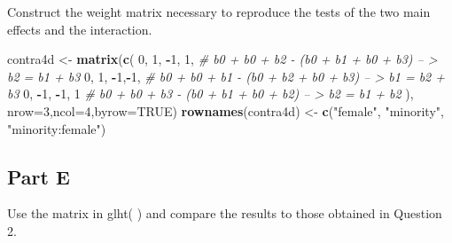 \documentclass[]{article}
\newenvironment{Shaded}{\begin{snugshade}}{\end{snugshade}}
\newcommand{\KeywordTok}[1]{\textcolor[rgb]{0.13,0.29,0.53}{\textbf{#1}}}
\newcommand{\DataTypeTok}[1]{\textcolor[rgb]{0.13,0.29,0.53}{#1}}
\newcommand{\DecValTok}[1]{\textcolor[rgb]{0.00,0.00,0.81}{#1}}
\newcommand{\StringTok}[1]{\textcolor[rgb]{0.31,0.60,0.02}{#1}}
\newcommand{\CommentTok}[1]{\textcolor[rgb]{0.56,0.35,0.01}{\textit{#1}}}
\newcommand{\OtherTok}[1]{\textcolor[rgb]{0.56,0.35,0.01}{#1}}
\newcommand{\OperatorTok}[1]{\textcolor[rgb]{0.81,0.36,0.00}{\textbf{#1}}}
\newcommand{\NormalTok}[1]{#1}
\begin{document}
Construct the weight matrix necessary to reproduce the tests of the two
main effects and the interaction.

\begin{Shaded}
\begin{Highlighting}[]
\NormalTok{contra4d <-}\StringTok{ }\KeywordTok{matrix}\NormalTok{(}\KeywordTok{c}\NormalTok{(}
    \DecValTok{0}\NormalTok{,  }\DecValTok{1}\NormalTok{, }\OperatorTok{-}\DecValTok{1}\NormalTok{, }\DecValTok{1}\NormalTok{, }\CommentTok{# b0 + b0 + b2 - (b0 + b1 + b0 + b3) -- > b2 = b1 + b3}
    \DecValTok{0}\NormalTok{,  }\DecValTok{1}\NormalTok{, }\OperatorTok{-}\DecValTok{1}\NormalTok{,}\OperatorTok{-}\DecValTok{1}\NormalTok{, }\CommentTok{# b0 + b0 + b1 - (b0 + b2 + b0 + b3) -- > b1 = b2 + b3}
    \DecValTok{0}\NormalTok{, }\OperatorTok{-}\DecValTok{1}\NormalTok{, }\OperatorTok{-}\DecValTok{1}\NormalTok{, }\DecValTok{1}  \CommentTok{# b0 + b0 + b3 - (b0 + b1 + b0 + b2) -- > b2 = b1 + b2}
\NormalTok{), }\DataTypeTok{nrow=}\DecValTok{3}\NormalTok{,}\DataTypeTok{ncol=}\DecValTok{4}\NormalTok{,}\DataTypeTok{byrow=}\OtherTok{TRUE}\NormalTok{)}
\KeywordTok{rownames}\NormalTok{(contra4d) <-}\StringTok{ }\KeywordTok{c}\NormalTok{(}\StringTok{"female"}\NormalTok{, }\StringTok{"minority"}\NormalTok{, }\StringTok{"minority:female"}\NormalTok{)}
\end{Highlighting}
\end{Shaded}

\subsection{Part E}\label{part-e-1}

Use the matrix in glht( ) and compare the results to those obtained in
Question 2.
\end{document}
